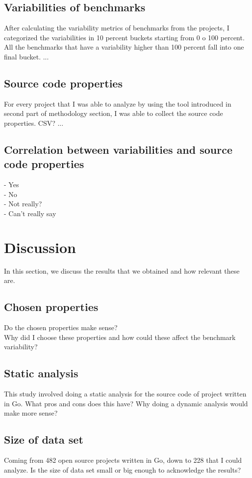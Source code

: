 \documentclass{seal_thesis}
\begin{document}
\section{Variabilities of benchmarks}
After calculating the variability metrics of benchmarks from the projects, I categorized the variabilities in 10 percent buckets starting from 0 o 100 percent. All the benchmarks that have a variability higher than 100 percent fall into one final bucket. ...

\section{Source code properties}
For every project that I was able to analyze by using the tool introduced in second part of methodology section, I was able to collect the source code properties. CSV? ...

\section{Correlation between variabilities and source code properties}
- Yes \\
- No \\
- Not really? \\
- Can't really say \\



\chapter{Discussion}
In this section, we discuss the results that we obtained and how relevant these are.
\section{Chosen properties}
Do the chosen properties make sense? \\
Why did I choose these properties and how could these affect the benchmark variability? \\

\section{Static analysis}
This study involved doing a static analysis for the source code of project written in Go. What pros and cons does this have? Why doing a dynamic analysis would make more sense?

\section{Size of data set}
Coming from 482 open source projects written in Go, down to 228 that I could analyze. Is the size of data set small or big enough to acknowledge the results?
\end{document}
